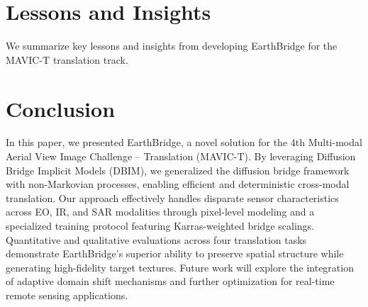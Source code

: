 \section{Lessons and Insights}
\label{sec:lessons}

We summarize key lessons and insights from developing EarthBridge for the MAVIC-T translation track.

\section{Conclusion}
\label{sec:conclusion}

In this paper, we presented EarthBridge, a novel solution for the 4th Multi-modal Aerial View Image Challenge -- Translation (MAVIC-T). By leveraging Diffusion Bridge Implicit Models (DBIM), we generalized the diffusion bridge framework with non-Markovian processes, enabling efficient and deterministic cross-modal translation. Our approach effectively handles disparate sensor characteristics across EO, IR, and SAR modalities through pixel-level modeling and a specialized training protocol featuring Karras-weighted bridge scalings. Quantitative and qualitative evaluations across four translation tasks demonstrate EarthBridge's superior ability to preserve spatial structure while generating high-fidelity target textures. Future work will explore the integration of adaptive domain shift mechanisms and further optimization for real-time remote sensing applications. 
